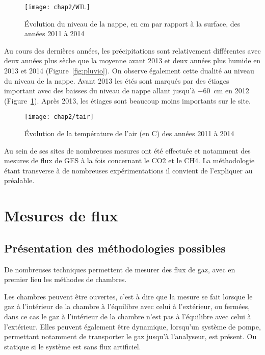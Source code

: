 \begin{figure}
\centering
\texttt{[image: chap2/WTL]}
\caption{Évolution du niveau de la nappe, en cm par rapport à la surface, des années 2011 à 2014}
\label{fig:WTL}
\end{figure}

Au cours des dernières années, les précipitations sont relativement différentes avec deux années plus sèche que la moyenne avant 2013 et deux années plus humide en 2013 et 2014 (Figure~\ref{fig:pluvio}).
On observe également cette dualité au niveau du niveau de la nappe.
Avant 2013 les étés sont marqués par des étiages important avec des baisses du niveau de nappe allant jusqu'à \SI{-60}{\cm} en 2012 (Figure~\ref{fig:WTL}).
Après 2013, les étiages sont beaucoup moins importants sur le site.



\begin{figure}
\centering
\texttt{[image: chap2/tair]}
\caption{Évolution de la température de l'air (en \textdegree C) des années 2011 à 2014}
\label{fig:tair}
\end{figure}



Au sein de ses sites de nombreuses mesures ont été effectuée et notamment des mesures de flux de GES à la fois concernant le CO2 et le CH4. La méthodologie étant transverse à de nombreuses expérimentations il convient de l'expliquer au préalable.

\section{Mesures de flux}
\label{sec:clsd_chbr_method}

\subsection{Présentation des méthodologies possibles}
De nombreuses techniques permettent de mesurer des flux de gaz, avec en premier lieu les méthodes de chambres.


Les chambres peuvent être ouvertes, c'est à dire que la mesure se fait lorsque le gaz à l'intérieur de la chambre à l'équilibre avec celui à l'extérieur, ou fermées, dans ce cas le gaz à l'intérieur de la chambre n'est pas à l'équilibre avec celui à l'extérieur.
Elles peuvent également être dynamique, lorsqu'un système de pompe, permettant notamment de transporter le gaz jusqu'à l'analyseur, est présent.
Ou statique si le système est sans flux artificiel.


